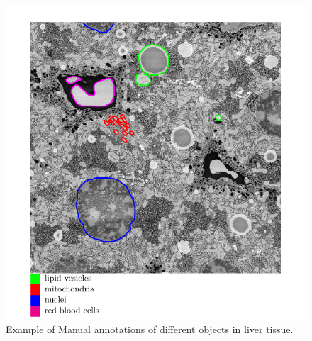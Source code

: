 \begin{figure}[h!] \label{fig:3dstack}
\centering
 \includegraphics[width=0.8\linewidth]{figures/vesicles.png}
\caption{Example of Manual annotations of different objects in liver tissue.}
\end{figure}


